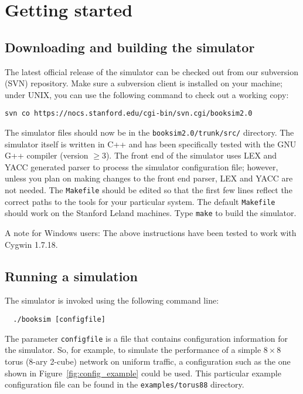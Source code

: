 \documentclass[11pt]{article}
\begin{document}
\section{Getting started}
\label{sec:get_started}

\subsection{Downloading and building the simulator}
\label{sec:download}

The latest official release of the simulator can be checked out from our subversion (SVN) repository. Make sure a subversion client is installed on your machine; under UNIX, you can use the following command to check out a working copy:

\begin{verbatim}
svn co https://nocs.stanford.edu/cgi-bin/svn.cgi/booksim2.0
\end{verbatim}

The simulator files should now be in the \texttt{booksim2.0/trunk/src/} directory.
The simulator itself is written in C++ and has been specifically tested with the GNU G++ compiler (version $\ge3$).
The front end of the simulator uses LEX and YACC generated parser to process the simulator configuration file; however, unless you plan on making changes to the front end parser, LEX and YACC are not needed.
The \texttt{Makefile} should be edited so that the first few lines reflect the correct paths to the tools for your particular system.
The default \texttt{Makefile} should work on the Stanford Leland machines.
Type \texttt{make} to build the simulator. 

A note for Windows users:
The above instructions have been tested to work with Cygwin 1.7.18.

\subsection{Running a simulation}
\label{sec:run_example}

The simulator is invoked using the following command line:
\begin{verbatim}
  ./booksim [configfile]
\end{verbatim}

The parameter \texttt{configfile} is a file that contains configuration information for the simulator.
So, for example, to simulate the performance of a simple $8 \times 8$ torus (8-ary 2-cube) network on uniform traffic, a configuration such as the one shown in Figure~\ref{fig:config_example} could be used.
This particular example configuration file can be found in the \texttt{examples/torus88} directory.
\end{document}
